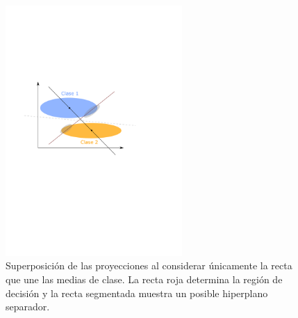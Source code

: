 \begin{figure}[H]
	\centering
	\includegraphics[width=0.6\textwidth]{img/cap6_fisher.pdf}
	\caption{Superposición de las proyecciones al considerar únicamente la recta que une las medias de clase. La recta roja determina la región de decisión y la recta segmentada muestra un posible hiperplano separador.}
	\label{fig:ej_fda}
\end{figure}

